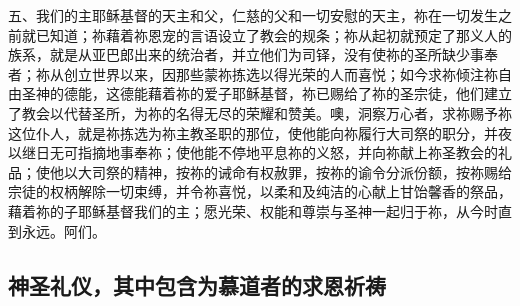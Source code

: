 五、我们的主耶稣基督的天主和父，仁慈的父和一切安慰的天主，祢在一切发生之前就已知道；祢藉着祢恩宠的言语设立了教会的规条；祢从起初就预定了那义人的族系，就是从亚巴郎出来的统治者，并立他们为司铎，没有使祢的圣所缺少事奉者；祢从创立世界以来，因那些蒙祢拣选以得光荣的人而喜悦；如今求祢倾注祢自由圣神的德能，这德能藉着祢的爱子耶稣基督，祢已赐给了祢的圣宗徒，他们建立了教会以代替圣所，为祢的名得无尽的荣耀和赞美。噢，洞察万心者，求祢赐予祢这位仆人，就是祢拣选为祢主教圣职的那位，使他能向祢履行大司祭的职分，并夜以继日无可指摘地事奉祢；使他能不停地平息祢的义怒，并向祢献上祢圣教会的礼品；使他以大司祭的精神，按祢的诫命有权赦罪，按祢的谕令分派份额，按祢赐给宗徒的权柄解除一切束缚，并令祢喜悦，以柔和及纯洁的心献上甘饴馨香的祭品，藉着祢的子耶稣基督我们的主；愿光荣、权能和尊崇与圣神一起归于祢，从今时直到永远。阿们。\par


\subsection{神圣礼仪，其中包含为慕道者的求恩祈祷}


